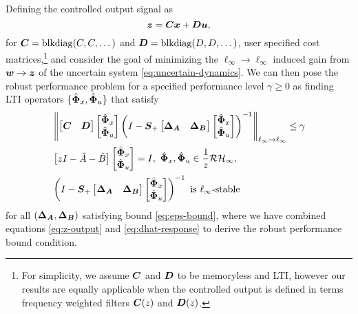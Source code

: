 Defining the controlled output signal as 
\begin{equation}
\boldsymbol{z} = \boldsymbol{C}\boldsymbol{x} + \boldsymbol{D}\boldsymbol{u},
\label{eq:z-output}
\end{equation}
for $\boldsymbol{C} = \mathrm{blkdiag}(C,C,\dots)$ and $\boldsymbol{D} = \mathrm{blkdiag}(D,D,\dots)$, user specified cost matrices,\footnote{For simplicity, we assume $\boldsymbol{C}$ and $\boldsymbol{D}$ to be memoryless and LTI, however our results are equally applicable when the controlled output is defined in terms frequency weighted filters $\boldsymbol{C}(z)$ and $\boldsymbol{D}(z)$.} and consider the goal of minimizing the $\ell_\infty\to\ell_\infty$ induced gain from $\boldsymbol{w} \to \boldsymbol{z}$ of the uncertain system \eqref{eq:uncertain-dynamics}.  We can then pose the robust performance problem for a specified performance level $\gamma \geq 0$ as finding LTI operators $\{\hat{\boldsymbol{\Phi}}_x,\hat{\boldsymbol{\Phi}}_u\}$ that satisfy 
\begin{equation}\label{eq:robust-perf1}
\begin{aligned}
& \linffnorm{\begin{bmatrix} \tf C & \tf D \end{bmatrix} \begin{bmatrix} \Phixh \\ \Phiuh \end{bmatrix} \left(I-\Sp\begin{bmatrix} \DA & \DB \end{bmatrix}\begin{bmatrix} \Phixh \\ \Phiuh \end{bmatrix}\right)^{-1} } \leq \gamma \\
& \begin{bmatrix} zI - \hat A   - \hat B \end{bmatrix}\begin{bmatrix} \Phixh \\ \Phiuh \end{bmatrix} = I,\ \Phixh, \Phiuh \in \frac{1}{z}\RHinf, \\
& \left(I-\Sp\begin{bmatrix} \DA & \DB \end{bmatrix}\begin{bmatrix} \Phixh \\ \Phiuh \end{bmatrix}\right)^{-1} \text{ is $\ell_\infty$-stable}
\end{aligned}
\end{equation}
for all $({\boldsymbol{\Delta}}_{\boldsymbol{A}},{\boldsymbol{\Delta}}_{\boldsymbol{B}})$ satisfying bound \eqref{eq:eps-bound}, where we have combined equations \eqref{eq:z-output} and \eqref{eq:dhat-response} to derive the robust performance bound condition.

